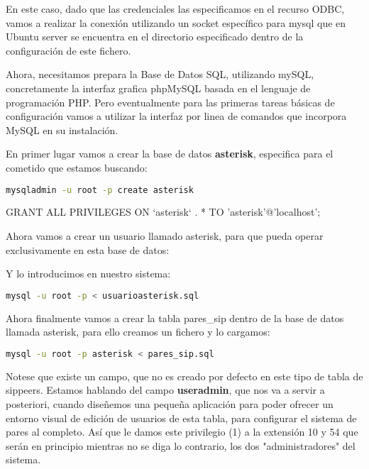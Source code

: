 En este caso, dado que las credenciales las especificamos en el recurso ODBC, vamos a realizar la conexión utilizando un socket específico para mysql que en Ubuntu server se encuentra en el directorio especificado dentro de la configuración de este fichero.

Ahora, necesitamos prepara la Base de Datos SQL, utilizando mySQL, concretamente la interfaz grafica phpMySQL basada en el lenguaje de programación PHP. Pero eventualmente para las primeras tareas básicas de configuración vamos a utilizar la interfaz por linea de comandos que incorpora MySQL en su instalación.

En primer lugar vamos a crear la base de datos \textbf{asterisk}, especifica para el cometido que estamos buscando:

\begin{lstlisting}[language=sh]
mysqladmin -u root -p create asterisk
\end{lstlisting}

GRANT ALL PRIVILEGES ON `asterisk` . * TO 'asterisk'@'localhost';


Ahora vamos a crear un usuario llamado asterisk, para que pueda operar exclusivamente en esta base de datos:



Y lo introducimos en nuestro sistema:

\begin{lstlisting}[language=sh]
mysql -u root -p < usuarioasterisk.sql
\end{lstlisting}

Ahora finalmente vamos a crear la tabla pares\_sip dentro de la base de datos llamada asterisk, para ello creamos un fichero y lo cargamos:



\begin{lstlisting}[language=sh]
mysql -u root -p asterisk < pares_sip.sql
\end{lstlisting}

Notese que existe un campo, que no es creado por defecto en este tipo de tabla de sippeers. Estamos hablando del campo \textbf{useradmin}, que nos va a servir a posteriori, cuando diseñemos una pequeña aplicación para poder ofrecer un entorno visual de edición de usuarios de esta tabla, para configurar el sistema de pares al completo. Así que le damos este privilegio (1) a la extensión 10 y 54 que serán en principio mientras no se diga lo contrario, los dos "administradores" del sistema.

